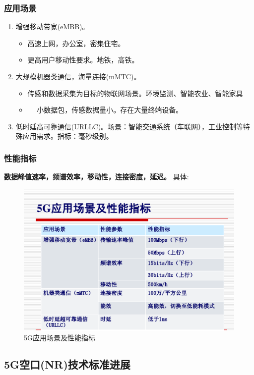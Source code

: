 \documentclass{report}
\begin{document}
	\subsubsection{应用场景}
	\begin{enumerate}
		\item 增强移动带宽(eMBB)。
		\begin{itemize}
			\item 高速上网，办公室，密集住宅。
			\item 更高用户移动性要求。地铁，高铁。
		\end{itemize}
		\item 大规模机器类通信，海量连接(mMTC)。
		\begin{itemize}
			\item 传感和数据采集为目标的物联网场景。环境监测、智能农业、智能家具
			\item　 小数据包，传感数据量小。存在大量终端设备。
		\end{itemize}
		
		\item 低时延高可靠通信(URLLC)。场景：智能交通系统（车联网），工业控制等特殊应用需求。指标：毫秒级别。
	\end{enumerate}
	\subsubsection{性能指标}
	\textbf{数据峰值速率，频谱效率，移动性，连接密度，延迟。}
	具体:
	\begin{figure}[H]
		\centering
		\includegraphics[width=\linewidth]{5G应用场景及性能指.png}
		\caption{5G应用场景及性能指标}
	\end{figure}
	\subsection{5G空口(NR)技术标准进展}
\end{document}

